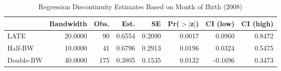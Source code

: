 \begin{table}[ht]
\centering
\begin{tabular}{lrrrrrrr}
  \hline
 & Bandwidth & Obs. & Est. & SE & Pr($>$$|$z$|$) & CI (low) & CI (high) \\ 
  \hline
LATE & 20.0000 & 90 & 0.6554 & 0.2090 & 0.0017 & 0.0960 & 0.8472 \\ 
  Half-BW & 10.0000 & 41 & 0.6796 & 0.2913 & 0.0196 & 0.0324 & 0.5475 \\ 
  Double-BW & 40.0000 & 175 & 0.3805 & 0.1535 & 0.0132 & -0.1696 & 0.3473 \\ 
   \hline
\end{tabular}
\caption{Regression Discontinuity Estimates Based on Month of Birth (2008)} 
\label{tab:rd2008m2}
\end{table}
